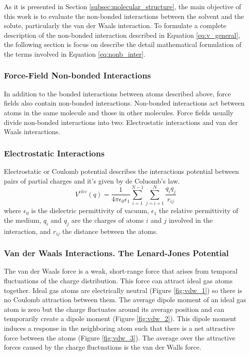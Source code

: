 As it is presented in Section \ref{subsec:molecular_structure}, the main objective of this work is to evaluate the non-bonded interactions between the solvent and the solute, particularly the van der Waals interaction. To formulate a complete description of the non-bonded interaction described in Equation \ref{eq:v_general}, the following section is focus on describe the detail mathematical formulation of the terms involved in Equation \ref{eq:nonb_inter}.  

\subsubsection{Force-Field Non-bonded Interactions}

In addition to the bonded interactions between atoms described above, force fields also contain non-bonded interactions. Non-bonded interactions act between atoms in the same molecule and those in other molecules. Force fields usually divide non-bonded interactions into two: Electrostatic interactions and van der Waals interactions.

\subsubsection*{Electrostatic Interactions}
Electrostatic or Coulomb potential describes the interactions potential between pairs of partial charges and it's given by de Coluomb's law.
\begin{equation}
    V^{elec}(q)=\frac{1}{4\pi\epsilon_{0}\epsilon_{1}}\sum_{i=1}^{N-1}\sum_{j=i+1}^{N}\frac{q_{i}q_{j}}{r_{ij}}
    \label{eq:electrostatic}
\end{equation}
where $\epsilon_{0}$ is the dielectric permittivity of vacuum, $\epsilon_{1}$ the relative permittivity of the medium, $q_{i}$ and $q_{j}$ are the charges of atoms $i$ and $j$ involved in the interaction, and $r_{ij}$ the distance between the atoms. 

\subsubsection*{Van der Waals Interactions. The Lenard-Jones Potential}\label{subsubsec:LJ}
The van der Waals force is a weak, short-range force that arises from temporal fluctuations of the charge distribution. This force can attract ideal gas atoms together. Ideal gas atoms are electrically neutral (Figure \ref{fig:vdw_1}) so there is no Coulomb attraction between them. The average dipole moment of an ideal gas atom is zero but the charge fluctuates around its average position and can temporarily create a dipole moment (Figure \ref{fig:vdw_2}). This dipole moment induces a response in the neighboring atom such that there is a net attractive force between the atoms (Figure \ref{fig:vdw_3}). The average over the attractive forces caused by the charge fluctuations is the van der Walls force.

